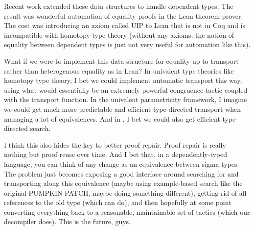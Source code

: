 Recent work extended these data structures to handle dependent types. The result was wonderful automation of equality proofs in the Lean theorem prover. The cost was introducing an axiom called UIP to Lean that is not in Coq and is incompatible with homotopy type theory (without any axioms, the notion of equality between dependent types is just not very useful for automation like this).

What if we were to implement this data structure for equality up to transport rather than heterogenous equality as in Lean? In univalent type theories like homotopy type theory, I bet we could implement automatic transport this way, using what would essentially be an extremely powerful congruence tactic coupled with the transport function. In the univalent parametricity framework, I imagine we could get much more predictable and efficient type-directed transport when managing a lot of equivalences. And in \toolname, I bet we could also get efficient type-directed search.

I think this also hides the key to better proof repair. Proof repair is really nothing but proof reuse over time. And I bet that, in a dependently-typed language, you can think of any change as an equivalence between sigma types. The problem just becomes exposing a good interface around searching for and transporting along this equivalence (maybe using example-based search like the original PUMPKIN PATCH, maybe doing something different), getting rid of all references to the old type (which \toolname can do), and then hopefully at some point converting everything back to a reasonable, maintainable set of tactics (which our decompiler does). This is the future, guys.

